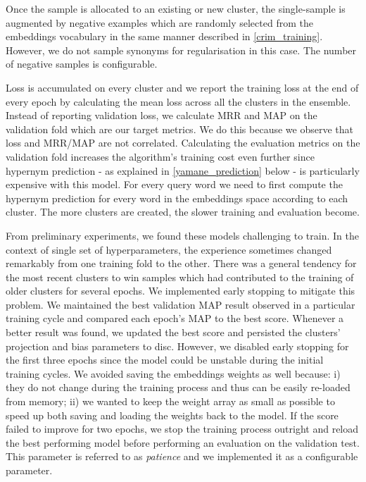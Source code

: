 Once the sample is allocated to an existing or new cluster, the single-sample is augmented by negative examples which are randomly selected from the embeddings vocabulary in the same manner described in \cref{crim_training}.  However, we do not sample synonyms for regularisation in this case.  The number of negative samples is configurable.

Loss is accumulated on every cluster and we report the training loss at the end of every epoch by calculating the mean loss across all the clusters in the ensemble.  Instead of reporting validation loss, we calculate \ac{MRR} and \ac{MAP} on the validation fold which are our target metrics.  We do this because we observe that loss and \ac{MRR}/\ac{MAP} are not correlated.  Calculating the evaluation metrics on the validation fold increases the algorithm's training cost even further since hypernym prediction - as explained in \cref{yamane_prediction} below - is particularly expensive with this model.  For every query word we need to first compute the hypernym prediction for every word in the embeddings space according to each cluster.  The more clusters are created, the slower training and evaluation become.

From preliminary experiments, we found these models challenging to train.  In the context of single set of hyperparameters, the experience sometimes changed remarkably from one training fold to the other.  There was a general tendency for the most recent clusters to win samples which had contributed to the training of older clusters for several epochs.  We implemented early stopping to mitigate this problem.  We maintained the best validation MAP result observed in a particular training cycle and compared each epoch's MAP to the best score.  Whenever a better result was found, we updated the best score and persisted the clusters' projection and bias parameters to disc.  However, we disabled early stopping for the first three epochs since the model could be unstable during the initial training cycles.  We avoided saving the embeddings weights as well because: i) they do not change during the training process and thus can be easily re-loaded from memory; ii) we wanted to keep the weight array as small as possible to speed up both saving and loading the weights back to the model. If the score failed to improve for two epochs, we stop the training process outright and reload the best performing model before performing an evaluation on the validation test.  This parameter is referred to as \textit{patience} and we implemented it as a configurable parameter.

